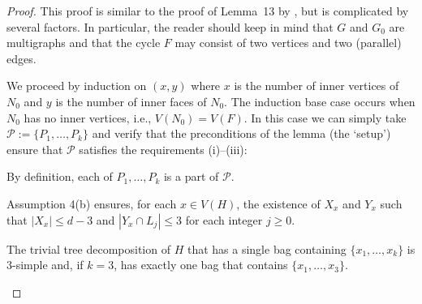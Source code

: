 \documentclass{patmorin}
\theoremstyle{plain}
\theoremstyle{definition}
\newcommand{\note}[2]{\noindent{\color{red}[#1:~#2]}}
\newcommand{\PP}{\mathcal{P}}
\renewcommand{\ge}{\geqslant}
\renewcommand{\le}{\leqslant}
\begin{document}
\begin{proof}
	This proof is similar to the proof of Lemma~13 by \citet{DJMMUW20}, but is complicated by several factors.  In particular, the reader should keep in mind that $G$ and $G_0$ are multigraphs and that the cycle $F$ may consist of two vertices and two (parallel) edges.

  We proceed by induction on $(x,y)$ where $x$ is the number of inner vertices of $N_0$ and $y$ is the number of inner faces of $N_0$.  The induction base case occurs when $N_0$ has no inner vertices, i.e., $V(N_0)=V(F)$. In this case we can simply take
	$\PP:=\{P_1,\ldots,P_k\}$ and verify that the preconditions of the lemma (the `setup') ensure that $\PP$ satisfies the requirements (i)--(iii):
	\begin{compactenum}[(i)]
		\item By definition, each of $P_1,\ldots,P_k$ is a part of $\mathcal{P}$.
		\item Assumption 4(b) ensures, for each $x\in V(H)$, the existence of $X_x$ and $Y_x$ such that $|X_x|\le d-3$ and $|Y_x\cap L_j|\le 3$ for each integer $j\ge 0$.
		\item The trivial tree decomposition of $H$ that has a single bag containing $\{x_1,\ldots,x_k\}$ is $3$-simple and, if $k=3$, has exactly one bag that contains $\{x_1,\ldots,x_3\}$.
	\end{compactenum}



\end{proof}
\end{document}

